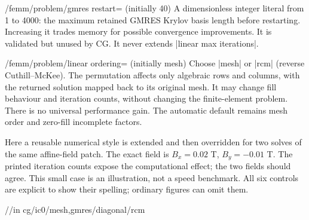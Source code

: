 \begin{key}{/femm/problem/gmres restart= (initially 40)}
A dimensionless integer literal from 1 to 4000: the maximum retained GMRES
Krylov basis length before restarting. Increasing it trades memory for possible
convergence improvements. It is validated but unused by CG. It never extends
|linear max iterations|.
\end{key}
\begin{key}{/femm/problem/linear ordering= (initially mesh)}
Choose |mesh| or |rcm| (reverse Cuthill--McKee). The permutation affects only
algebraic rows and columns, with the returned solution mapped back to its
original mesh. It may change fill behaviour and iteration counts, without
changing the finite-element problem. There is no universal performance gain.
The automatic default remains mesh order and zero-fill incomplete factors.
\end{key}

Here a reusable numerical style is extended and then overridden for two solves
of the same affine-field patch. The exact field is $B_x=0.02$ T,
$B_y=-0.01$ T. The printed iteration counts expose the computational effect;
the two fields should agree. This small case is an illustration, not a speed
benchmark. All six controls are explicit to show their spelling; ordinary
figures can omit them.

\noindent\begin{minipage}{\linewidth}
\begin{codeexample}[width=0pt]
\foreach \method/\factor/\order in
  {cg/ic0/mesh,gmres/diagonal/rcm}{%
 \quad
}
\end{codeexample}
\end{minipage}

